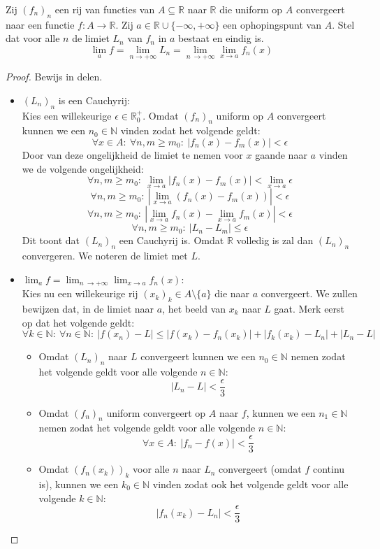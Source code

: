 \documentclass[main.tex]{subfiles}
\begin{document}
\begin{bst}
  Zij $(f_{n})_{n}$ een rij van functies van $A \subseteq \mathbb{R}$ naar $\mathbb{R}$ die uniform op $A$ convergeert naar een functie $f: A \rightarrow \mathbb{R}$.
  Zij $a\in \mathbb{R} \cup \{-\infty,+\infty\}$ een ophopingspunt van $A$.
  Stel dat voor alle $n$ de limiet $L_{n}$ van $f_{n}$ in $a$ bestaat en eindig is.
  \[ \lim_{a}f = \lim_{n \rightarrow +\infty} L_{n} = \lim_{n\ \rightarrow +\infty} \lim_{x \rightarrow a} f_{n}(x) \]

  \begin{proof}
    Bewijs in delen.
    \begin{itemize}
    \item $(L_{n})_{n}$ is een Cauchyrij:\\
      Kies een willekeurige $\epsilon \in \mathbb{R}_{0}^{+}$.
      Omdat $(f_{n})_{n}$ uniform op $A$ convergeert kunnen we een $n_{0}\in \mathbb{N}$ vinden zodat het volgende geldt:
      \[ \forall x\in A:\ \forall n,m \ge m_{0}:\ |f_{n}(x) -f_{m}(x)| < \epsilon \]
      Door van deze ongelijkheid de limiet te nemen voor $x$ gaande naar $a$ vinden we de volgende ongelijkheid:
      \[ \forall n,m \ge m_{0}:\ \lim_{x \rightarrow a}|f_{n}(x) -f_{m}(x)| < \lim_{x \rightarrow a}\epsilon\]
      \[ \forall n,m \ge m_{0}:\ |\lim_{x \rightarrow a}\left(f_{n}(x) -f_{m}(x)\right)| < \epsilon\]
      \[ \forall n,m \ge m_{0}:\ |\lim_{x \rightarrow a}f_{n}(x) -\lim_{x \rightarrow a}f_{m}(x)| < \epsilon\]
      \[ \forall n,m \ge m_{0}:\ |L_{n}-L_{m}| \le \epsilon \]
      Dit toont dat $(L_{n})_{n}$ een Cauchyrij is.
      Omdat $\mathbb{R}$ volledig is zal dan $(L_{n})_{n}$ convergeren.
      We noteren de limiet met $L$.
    \item $\lim_{a}f =  \lim_{n\ \rightarrow +\infty} \lim_{x \rightarrow a} f_{n}(x)$:\\
      Kies nu een willekeurige rij $(x_{k})_{k} \in A\setminus \{a\}$ die naar $a$ convergeert.
      We zullen bewijzen dat, in de limiet naar $a$, het beeld van $x_{k}$ naar $L$ gaat.
      Merk eerst op dat het volgende geldt:
      \[ \forall k\in \mathbb{N}:\ \forall n\in \mathbb{N}:\ |f(x_{n})-L| \le |f(x_{k}) -f_{n}(x_{k})| + |f_{k}(x_{k})-L_{n}| + |L_{n}-L| \]
      \begin{itemize}
      \item 
        Omdat $(L_{n})_{n}$ naar $L$ convergeert kunnen we een $n_{0}\in\mathbb{N}$ nemen zodat het volgende geldt voor alle volgende $n\in \mathbb{N}$:
        \[ |L_{n}-L| < \frac{\epsilon}{3} \]
      \item Omdat $(f_{n})_{n}$ uniform convergeert op $A$ naar $f$, kunnen we een $n_{1}\in \mathbb{N}$  nemen zodat het volgende geldt voor alle volgende $n\in \mathbb{N}$:
        \[ \forall x\in A:\ |f_{n}-f(x)| < \frac{\epsilon}{3} \]
      \item Omdat
        $(f_{n}(x_{k}))_{k}$ voor alle $n$ naar $L_{n}$ convergeert (omdat $f$ continu is)\needed, kunnen we een $k_{0} \in \mathbb{N}$ vinden zodat ook het volgende geldt voor alle volgende $k \in \mathbb{N}$:
        \[ |f_{n}(x_{k}) - L_{n}| < \frac{\epsilon}{3} \]
      \end{itemize}


\end{itemize}
\end{proof}
\end{bst}
\end{document}
